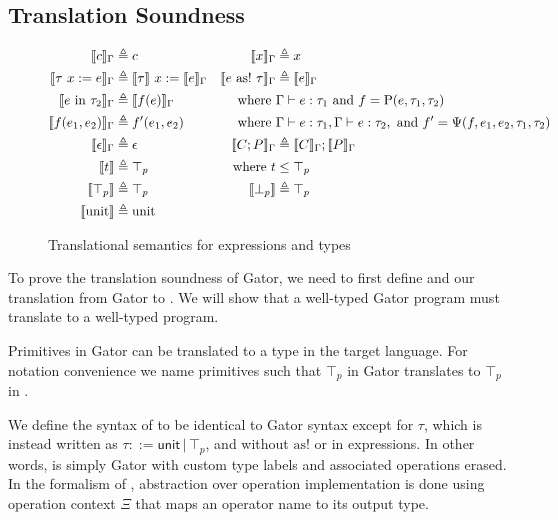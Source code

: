 \subsection{Translation Soundness}
\begin{figure}
	\begin{align*}
		\llbracket c \rrbracket_\Gamma &\triangleq c &
		\llbracket x \rrbracket_\Gamma &\triangleq x \\
		\llbracket \tau\ x := e \rrbracket_\Gamma &\triangleq \llbracket \tau \rrbracket\ x := \llbracket e \rrbracket_\Gamma &
		\llbracket e\ \mathrm{as!}\ \tau \rrbracket_\Gamma&\triangleq \llbracket e \rrbracket_\Gamma \\
		\llbracket e\ \mathrm{in}\ \tau_2 \rrbracket_\Gamma&\triangleq \llbracket f(e) \rrbracket_\Gamma&\text{where }&\Gamma|-e:\tau_1\text{ and }f=\mathrm{P}(e,\tau_1,\tau_2)\\
		\llbracket f(e_1, e_2) \rrbracket_\Gamma&\triangleq f'(e_1, e_2)&\text{where }&\Gamma|-e:\tau_1,\Gamma|-e:\tau_2,\text{ and }f'=\Psi(f,e_1,e_2,\tau_1,\tau_2)\\
		\llbracket \epsilon \rrbracket_\Gamma&\triangleq \epsilon&
		\llbracket C;P \rrbracket_\Gamma&\triangleq\llbracket C \rrbracket_\Gamma;\llbracket P \rrbracket_\Gamma\\
		\llbracket t \rrbracket&\triangleq \top_p&\text{where }t&\leq\top_p\\
		\llbracket \top_p \rrbracket&\triangleq \top_p &
		\llbracket \bot_p \rrbracket&\triangleq \top_p \\
		\llbracket \textrm{unit} \rrbracket&\triangleq \textrm{unit}
	\end{align*}
	\caption{Translational semantics for expressions and types}
	\label{fig:translation}
\end{figure}

To prove the translation soundness of Gator, we need to first define \targlang and our translation from Gator to \targlang.
We will show that a well-typed Gator program must translate to a well-typed \targlang program. 

Primitives in Gator can be translated to a type in the target language. 
For notation convenience we name primitives such that $\top_p$ in Gator translates to $\top_p$ in \targlang.

We define the syntax of \targlang to be identical to Gator syntax except for $\tau$, which is instead written as $\tau::=\mathsf{unit}\,|\,\top_p$, and without $\textrm{as!}$ or $\textrm{in}$ expressions.
In other words, \targlang is simply Gator with custom type labels and associated operations erased.
In the formalism of \targlang, abstraction over operation implementation is done using operation context $\Xi$ that maps an operator name to its output type.


